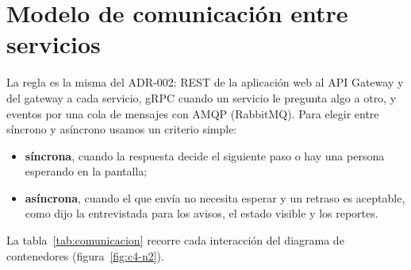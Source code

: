 \section{Modelo de comunicación entre servicios}
\label{sec:comunicacion}

La regla es la misma del ADR-002: REST de la aplicación web al API Gateway y del gateway a cada servicio, gRPC cuando un servicio le pregunta algo a otro, y eventos por una cola de mensajes con AMQP (RabbitMQ). Para elegir entre síncrono y asíncrono usamos un criterio simple:

\begin{itemize}
  \item \textbf{síncrona}, cuando la respuesta decide el siguiente paso o hay una persona esperando en la pantalla;
  \item \textbf{asíncrona}, cuando el que envía no necesita esperar y un retraso es aceptable, como dijo la entrevistada para los avisos, el estado visible y los reportes.
\end{itemize}

La tabla~\ref{tab:comunicacion} recorre cada interacción del diagrama de contenedores (figura~\ref{fig:c4-n2}).

